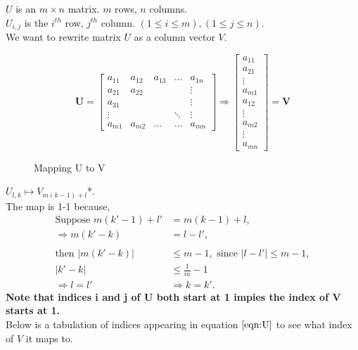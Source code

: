 \documentclass[letter]{article}
\begin{document}
	$U$ is an $m \times n$ matrix. $m$ rows, $n$ columns.\\
	$U_{i,j}$ is the $i^{th}$ row, $j^{th}$ column. $(1 \leq i \leq m), (1 \leq j \leq n)$.\\
	We want to rewrite matrix $U$ as a column vector $V$.
	\begin{figure}	
	\[ 		
	\mathbf{U} = 
	\begin{bmatrix}
		a_{11}	 	& a_{12}	& a_{13} 	& \hdots	& 	a_{1n}	 	\\
		a_{21} 		& a_{22}	& 	 		& 			& 	\vdots	 	\\
		a_{31}		& 			& 	 		& 			&	\vdots		\\
		\vdots		& 			& 			& \ddots	&	\vdots		\\
		a_{m1}	 	& a_{m2}	& \hdots	& \hdots	& 	a_{mn}
	\end{bmatrix}
	\Rightarrow
	\begin{bmatrix}
		a_{11}\\
		a_{21}\\
		\vdots\\
		a_{m1}\\
		a_{12}\\
		\vdots\\
		a_{m2}\\
		\vdots\\
		a_{mn}
	\end{bmatrix}
	= \mathbf{V}		
	\]
	\caption{Mapping U to V}
	\label{matrix:U-V}	
	\end{figure}
	$U_{l,k} \mapsto V_{m(k-1)+l}$*.\\
	The map is 1-1 because,
	\begin{align*}
		\text{Suppose } m(k' - 1) + l' &= m(k-1)+l,\\
		\Rightarrow	m(k' - k) &= l - l',\\
		\\
		\text{then } |m(k'-k)| &\leq m-1, \text{ since $|l - l'| \leq m-1$},\\
		|k' - k| &\leq  \frac{1}{m} - 1 \\
		\Rightarrow l=l' &\Rightarrow k=k'. 
	\end{align*}
	\textbf{Note that indices i and j of U both start at 1 impies the index of V starts at 1.}\\
	Below is a tabulation of indices appearing in equation $\ref{eqn:U}$ to see what index of $V$ it maps to.\\
\end{document}
